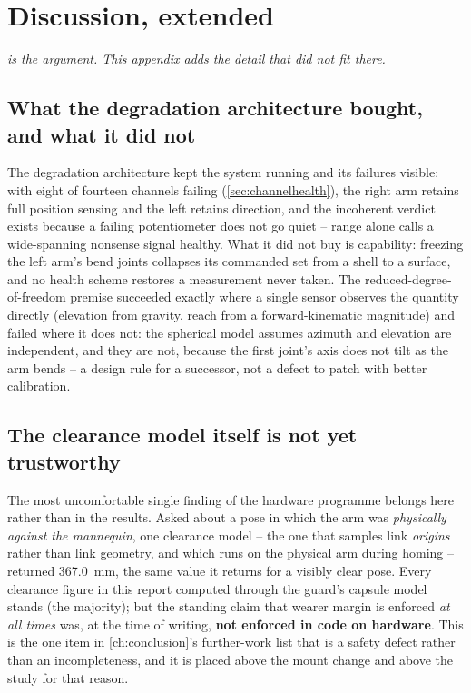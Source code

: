 \chapter{Discussion, extended}
\label{ch:discussion}

\noindent\emph{ is the argument. This appendix adds
the detail that did not fit there.}

\section{What the degradation architecture bought, and what it did not}
\label{sec:degradation-appendix}

The degradation architecture kept the system running and its failures
visible: with eight of fourteen channels failing (\cref{sec:channelhealth}),
the right arm retains full position sensing and the left retains direction,
and the incoherent verdict exists because a failing potentiometer does not
go quiet -- range alone calls a wide-spanning nonsense signal healthy. What
it did not buy is capability: freezing the left arm's bend joints collapses
its commanded set from a shell to a surface, and no health scheme restores
a measurement never taken. The reduced-degree-of-freedom premise succeeded
exactly where a single sensor observes the quantity directly (elevation
from gravity, reach from a forward-kinematic magnitude) and failed where it
does not: the spherical model assumes azimuth and elevation are
independent, and they are not, because the first joint's axis does not
tilt as the arm bends -- a design rule for a successor, not a defect to
patch with better calibration.

\section{The clearance model itself is not yet trustworthy}

The most uncomfortable single finding of the hardware programme belongs
here rather than in the results. Asked about a pose in which the arm was
\emph{physically against the mannequin}, one clearance model -- the one that
samples link \emph{origins} rather than link geometry, and which runs on the
physical arm during homing -- returned \SI{367.0}{\milli\metre}, the same
value it returns for a visibly clear pose. Every clearance figure in this
report computed through the guard's capsule model stands (the majority);
but the standing claim that wearer margin is enforced \emph{at all times}
was, at the time of writing, \textbf{not enforced in code on hardware}. This
is the one item in \cref{ch:conclusion}'s further-work list that is a safety
defect rather than an incompleteness, and it is placed above the mount
change and above the study for that reason.

